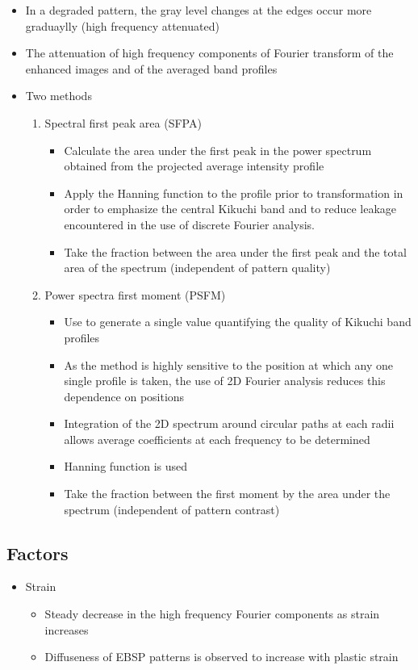\documentclass[letterpaper]{article}
\begin{document}
\begin{itemize}
\begin{itemize}
						\item In a degraded pattern, the gray level changes at the edges occur more graduaylly (high frequency attenuated)
						\item The attenuation of high frequency components of Fourier transform of the enhanced images and of the averaged band profiles
						\item Two methods
							\begin{enumerate}
								\item Spectral first peak area (SFPA)
									\begin{itemize}
										\item Calculate the area under the first peak in the power spectrum obtained from the projected average intensity profile
										\item Apply the Hanning function to the profile prior to transformation in order to emphasize the central Kikuchi band and to reduce leakage encountered in the use of discrete Fourier analysis.
										\item Take the fraction between the area under the first peak and the total area of the spectrum (independent of pattern quality)
									\end{itemize}
								\item Power spectra first moment (PSFM)
									\begin{itemize}
											\item Use to generate a single value quantifying the quality of Kikuchi band profiles
											\item As the method is highly sensitive to the position at which any one single profile is taken, the use of 2D Fourier analysis reduces this dependence on positions
											\item Integration of the 2D spectrum around circular paths at each radii allows average coefficients at each frequency to be determined
											\item Hanning function is used
											\item Take the fraction between the first moment by the area under the spectrum (independent of pattern contrast)
										\end{itemize}
							\end{enumerate}
					\end{itemize}
			\end{itemize}
		
		\subsection{Factors}
			\begin{itemize}
				\item Strain
					\begin{itemize}
						\item Steady decrease in the high frequency Fourier components as strain increases
						\item Diffuseness of EBSP patterns is observed to increase with plastic strain
					\end{itemize}
			\end{itemize}
		
\end{document}
